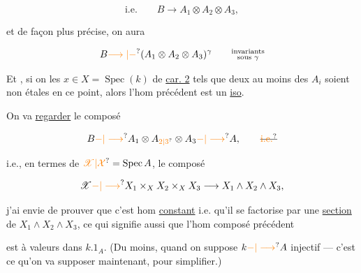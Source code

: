 \[
 \text{i.e.}\qquad B\longrightarrow A_1\otimes A_2\otimes A_3,
\]

et de façon plus précise, on aura

\[
 B\unsure{\longrightarrow|\mathord{-}}(A_1\otimes A_2\otimes A_3)^\gamma
 \qquad\substack{\text{invariants}\\\text{sous }\gamma}
\]

Et , si on  les $x\in X=\operatorname{Spec}(k)$ de \uline{car. 2} tels que deux au moins des $A_i$ soient non étales en ce point, alors l'hom précédent est un \uline{iso}.

On va \uline{regarder} le composé

\[
 B\unsure{\mathord{-}|\longrightarrow}A_1\otimes A_{\unsure{2|3}}\otimes A_3\unsure{\mathord{-}|\longrightarrow}A,\qquad\deleted{\unsure{\text{i.e.}}}
\]


i.e., en termes de $\unsure{\mathscr X|\mathcal X}=\operatorname{Spec} A$, le composé

\[
 \mathscr X\unsure{\mathord{-}|\longrightarrow} X_1\times_X X_2\times_X X_3\longrightarrow X_1\wedge X_2\wedge X_3,
\]

j'ai envie de prouver que c'est  hom \uline{constant} i.e. qu'il se factorise par une \uline{section} de $X_1\wedge X_2\wedge X_3$, ce qui signifie aussi que l'hom composé précédent


est à valeurs dans $k.1_A$. (Du moins,  quand on suppose $k\unsure{\mathord{-}|\longrightarrow}A$ injectif --- c'est ce qu'on va supposer maintenant, pour simplifier.)

